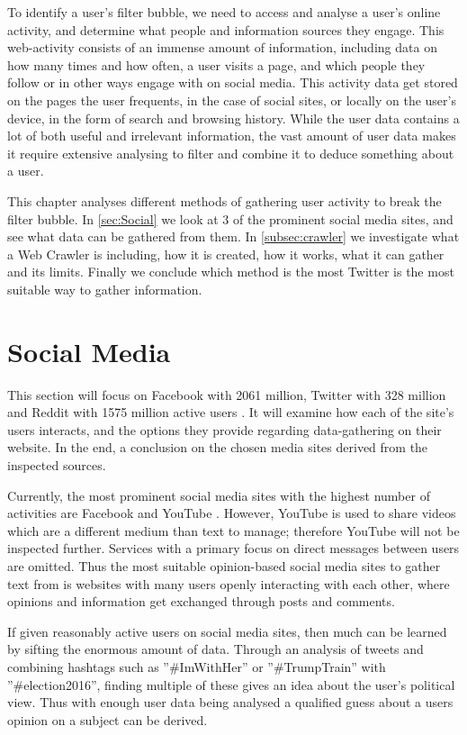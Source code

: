 
To identify a user's filter bubble, we need to access and analyse a user's
online activity, and determine what people and information sources they engage. This
web-activity consists of an immense amount of information, including data on how
many times and how often, a user visits a page, and which people they follow or
in other ways engage with on social media. This activity data get stored on the
pages the user frequents, in the case of social sites, or locally on the user's
device, in the form of search and browsing history. While the user data contains
a lot of both useful and irrelevant information, the vast amount of user data
makes it require extensive analysing to filter and combine it to deduce
something about a user.\nl

This chapter analyses different methods of gathering user activity to break the
filter bubble. In \autoref{sec:Social} we look at 3 of the prominent social
media sites, and see what data can be gathered from them. In
\autoref{subsec:crawler} we investigate what a Web Crawler is including, how it
is created, how it works, what it can gather and its limits. Finally we 
conclude which method is the most Twitter is the most suitable way to gather
information.

\section{Social Media}\label{sec:Social}
This section will focus on Facebook with 2061 million, Twitter with 328 million
and Reddit with 1575 million active users \citep{SocialMediaStats,
AdvertiseOnReddit}. It will examine how each of the site's users interacts, and
the options they provide regarding data-gathering on their website. In the end,
a conclusion on the chosen media sites derived from the inspected sources.

Currently, the most prominent social media sites with the highest number of
activities are Facebook and YouTube \citep{SocialMediaStats}. However, YouTube
is used to share videos which are a different medium than text to manage;
therefore YouTube will not be inspected further. Services with a primary focus
on direct messages between users are omitted. Thus the most suitable
opinion-based social media sites to gather text from is websites with many users
openly interacting with each other, where opinions and information get exchanged
through posts and comments.\nl

If given reasonably active users on social media sites, then much can be learned
by sifting the enormous amount of data. Through an analysis of tweets and
combining hashtags such as ”\#ImWithHer” or ”\#TrumpTrain” with
”\#election2016”, finding multiple of these gives an idea about the user's
political view. Thus with enough user data being analysed a qualified guess
about a users opinion on a subject can be derived.\nl
